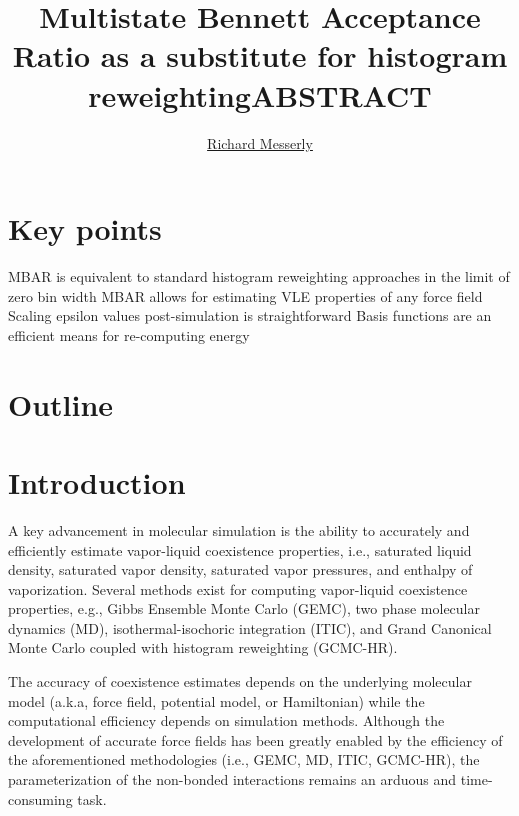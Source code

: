 \documentclass[11pt,a4paper]{article}
\begin{document}
	\thispagestyle{empty}
	\title{\Large \textbf{Multistate Bennett Acceptance Ratio as a substitute for histogram reweighting}}
	\author[1]{\large {\underline{Richard Messerly}}}%
	
	
	\date{} %
	\maketitle\thispagestyle{empty} %
	\begin{center}
		\title{\textbf{ABSTRACT}}\centering{}
	\end{center}
	\justify
	
\section*{Key points}

MBAR is equivalent to standard histogram reweighting approaches in the limit of zero bin width
MBAR allows for estimating VLE properties of any force field
Scaling epsilon values post-simulation is straightforward
Basis functions are an efficient means for re-computing energy

\section*{Outline}

\section{Introduction}

A key advancement in molecular simulation is the ability to accurately and efficiently estimate vapor-liquid coexistence properties, i.e., saturated liquid density, saturated vapor density, saturated vapor pressures, and enthalpy of vaporization. Several methods exist for computing vapor-liquid coexistence properties, e.g., Gibbs Ensemble Monte Carlo (GEMC), two phase molecular dynamics (MD), isothermal-isochoric integration (ITIC), and Grand Canonical Monte Carlo coupled with histogram reweighting (GCMC-HR).  

The accuracy of coexistence estimates depends on the underlying molecular model (a.k.a, force field, potential model, or Hamiltonian) while the computational efficiency depends on simulation methods. Although the development of accurate force fields has been greatly enabled by the efficiency of the aforementioned methodologies (i.e., GEMC, MD, ITIC, GCMC-HR), the parameterization of the non-bonded interactions remains an arduous and time-consuming task.
\end{document}
